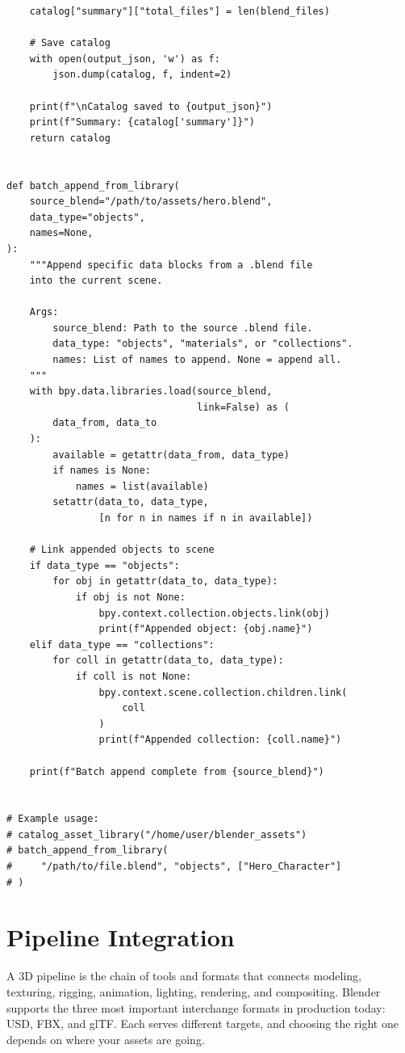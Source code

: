 \begin{lstlisting}
    catalog["summary"]["total_files"] = len(blend_files)

    # Save catalog
    with open(output_json, 'w') as f:
        json.dump(catalog, f, indent=2)

    print(f"\nCatalog saved to {output_json}")
    print(f"Summary: {catalog['summary']}")
    return catalog


def batch_append_from_library(
    source_blend="/path/to/assets/hero.blend",
    data_type="objects",
    names=None,
):
    """Append specific data blocks from a .blend file
    into the current scene.

    Args:
        source_blend: Path to the source .blend file.
        data_type: "objects", "materials", or "collections".
        names: List of names to append. None = append all.
    """
    with bpy.data.libraries.load(source_blend,
                                 link=False) as (
        data_from, data_to
    ):
        available = getattr(data_from, data_type)
        if names is None:
            names = list(available)
        setattr(data_to, data_type,
                [n for n in names if n in available])

    # Link appended objects to scene
    if data_type == "objects":
        for obj in getattr(data_to, data_type):
            if obj is not None:
                bpy.context.collection.objects.link(obj)
                print(f"Appended object: {obj.name}")
    elif data_type == "collections":
        for coll in getattr(data_to, data_type):
            if coll is not None:
                bpy.context.scene.collection.children.link(
                    coll
                )
                print(f"Appended collection: {coll.name}")

    print(f"Batch append complete from {source_blend}")


# Example usage:
# catalog_asset_library("/home/user/blender_assets")
# batch_append_from_library(
#     "/path/to/file.blend", "objects", ["Hero_Character"]
# )
\end{lstlisting}


\section{Pipeline Integration}
\label{sec:scripting-pipeline}

A 3D pipeline is the chain of tools and formats that connects modeling, texturing, rigging, animation, lighting, rendering, and compositing. Blender supports the three most important interchange formats in production today: USD, FBX, and glTF. Each serves different targets, and choosing the right one depends on where your assets are going.

